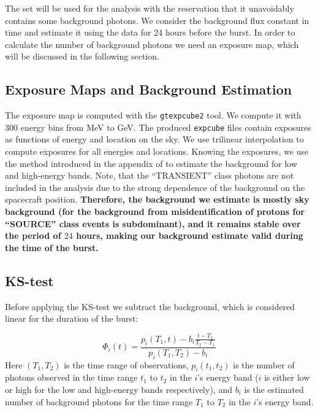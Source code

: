 \documentclass[manuscript]{aastex}
\begin{document}
The set will be used for the analysis with the reservation that it
unavoidably contains some background photons. We consider the
background flux constant in time and estimate it using the data for 24
hours before the burst. In order to calculate the number of background
photons we need an exposure map, which will be discussed in the
following section.

\subsection{Exposure Maps and Background Estimation}

The exposure map is computed with the \texttt{gtexpcube2} tool. We
compute it with 300 energy bins from \unit[100]{MeV} to
\unit[300]{GeV}. The produced \texttt{expcube} files contain exposures
as functions of energy and location on the sky. We use trilinear
interpolation to compute exposures for all energies and
locations. Knowing the exposures, we use the method introduced in the
appendix of \citet{Rubtsov:2011qq} to estimate the background for low
and high-energy bands. Note, that the ``TRANSIENT'' class photons are
not included in the analysis due to the strong dependence of the
background on the spacecraft position.
{\bf Therefore, the background we estimate is mostly sky background (for the background from misidentification of protons for ``SOURCE'' class events is subdominant), and it remains stable over the period of $24$ hours, making our background estimate valid during the time of the burst.}

\subsection{KS-test}

Before applying the KS-test we subtract the background, which is
considered linear for the duration of the burst:

\begin{equation}
	\Phi_i\left(t\right) = \frac{p_i\left(T_1, t\right) - b_i \frac{t-T_1}{T_2-T_1}}{p_i\left(T_1, T_2\right) - b_i}
\end{equation}
Here $\left(T_1, T_2\right)$ is the time range of observations,
$p_i\left(t_1, t_2\right)$ is the number of photons observed in the
time range $t_1$ to $t_2$ in the $i$'s energy band ($i$ is either low
or high for the low and high-energy bands respectively), and $b_i$ is
the estimated number of background photons for the time range $T_1$ to
$T_2$ in the $i$'s energy band.
\end{document}
